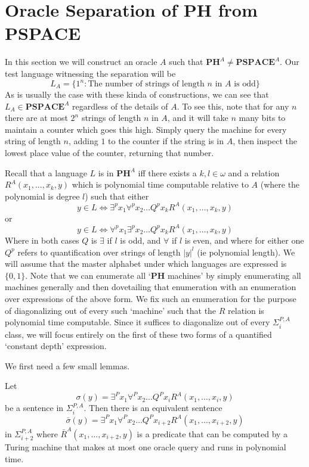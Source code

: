 \section{Oracle Separation of PH from PSPACE}
In this section we will construct an oracle $A$ such that $\bm{PH}^A \neq \bm{PSPACE}^A$. Our test language witnessing the separation will be 
\[ L_A =\{1^n: \textrm{The number of strings of length $n$ in $A$ is odd}\} \]
As is usually the case with these kinda of constructions, we can see that $L_A \in \bm{PSPACE}^A$ regardless of the details of $A$. To see this, note that for any $n$ there are at most $2^n$ strings of length $n$ in $A$, and it will take $n$ many bits to maintain a counter which goes this high. Simply query the machine for every string of length $n$, adding $1$ to the counter if the string is in $A$, then inspect the lowest place value of the counter, returning that number. \par 
Recall that a language $L$ is in $\bm{PH}^A$ iff there exists a $k,l \in \omega$ and a relation $R^A(x_1,...,x_k,y)$ which is polynomial time computable relative to $A$ (where the polynomial is degree $l$) such that either 
  \[ y \in L \iff \exists^px_1 \forall^p x_2 \ldots Q^p x_k R^A(x_1,\ldots,x_k,y) \]
 or
  \[ y \in L \iff \forall^px_1 \exists^p x_2 \ldots Q^p x_k R^A(x_1,\ldots,x_k,y) \]
Where in both cases $Q$ is $\exists$ if $l$ is odd, and $\forall$ if $l$ is even, and where for either one $Q^p$ refers to quantification over strings of length $|y|^l$ (ie polynomial length). We will assume that the master alphabet under which languages are expressed is $\{0,1\}$. Note that we can enumerate all `$\bm{PH}$ machines' by simply enumerating all machines generally and then dovetailing that enumeration with an enumeration over expressions of the above form. We fix such an enumeration for the purpose of diagonalizing out of every such `machine' such that the $R$ relation is polynomial time computable. Since it suffices to diagonalize out of every $\Sigma_i^{P,A}$ class, we will focus entirely on the first of these two forms of a quantified `constant depth' expression. \par 
We first need a few small lemmas. 
\begin{lemma}
	Let \[\sigma(y) = \exists^Px_1\forall^P x_2 \ldots Q^P x_i R^A(x_1,...,x_i,y) \]
	be a sentence in $\Sigma^{P,A}_i$. Then there is an equivalent sentence 
	\[ \bar{\sigma}(y) = \exists^Px_1\forall^P x_2 \ldots Q^P x_{i+2}R^A(x_1,...,x_{i+2},y) \]
	in $\Sigma^{P,A}_{i+2}$ where $\bar{R}^A(x_1,...,x_{i+2},y)$ is a predicate that can be computed by a Turing machine that makes at most one oracle query and runs in polynomial time. 
\end{lemma}

